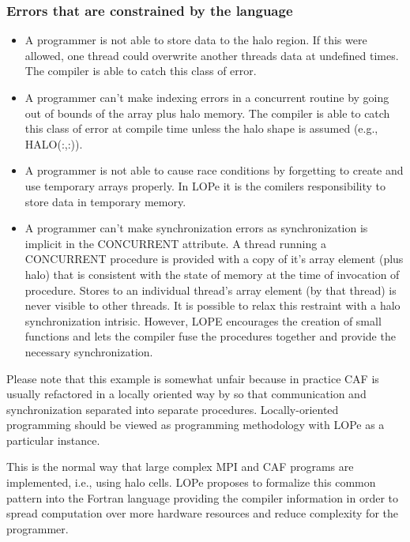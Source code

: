 \subsubsection{Errors that are constrained by the language}
\begin{itemize}

\item
A programmer is not able to store data to the halo region.  If this were
allowed, one thread could overwrite another threads data at undefined times.
The compiler is able to catch this class of error.

\item
A programmer can't make indexing errors in a concurrent routine by going out of
bounds of the array plus halo memory.  The compiler is able to catch this class of
error at compile time unless the halo shape is assumed (e.g., HALO(:,:)).

\item
A programmer is not able to cause race conditions by forgetting to create and
use temporary arrays properly.  In LOPe it is the comilers responsibility to
store data in temporary memory.

\item
A programmer can't make synchronization errors as synchronization is implicit in
the CONCURRENT attribute.  A thread running a CONCURRENT procedure is provided
with a copy of it's array element (plus halo) that is consistent with the state
of memory at the time of invocation of procedure.  Stores to an individual
thread's array element (by that thread) is never visible to other threads.
It is possible to relax this restraint with a halo synchronization intrisic.
However, LOPE encourages the creation of small functions and lets the compiler
fuse the procedures together and provide the necessary synchronization.

\end{itemize}

Please note that this example is somewhat unfair because in practice CAF is usually
refactored in a locally oriented way by so that communication and
synchronization separated into separate procedures.  Locally-oriented programming should be viewed as programming methodology with LOPe as a particular instance.

This is the normal way that large complex MPI and CAF programs are implemented, i.e., using
halo cells.  LOPe proposes to formalize this common pattern into the Fortran
language providing the compiler information in order to spread computation over
more hardware resources and reduce complexity for the programmer.
